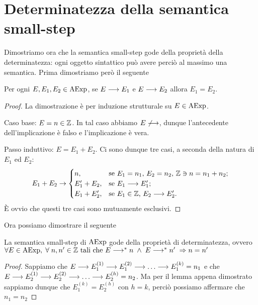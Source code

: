 \section{Determinatezza della semantica small-step}
Dimostriamo ora che la semantica small-step gode della proprietà della
determinatezza: ogni oggetto sintattico può avere perciò al massimo
una semantica. Prima dimostriamo però il seguente

\begin{teorema}
Per ogni $E, E_1, E_2 \in \mathrm{AExp}$, se $E \longrightarrow E_1$ e $E \longrightarrow E_2$
allora $E_1 = E_2$.
\end{teorema}

\begin{proof}
La dimostrazione è per induzione strutturale su $E \in \mathrm{AExp}$.

Caso base: $E = n \in \mathbb{Z}$.
In tal caso abbiamo $E \not \longrightarrow$, dunque l'antecedente dell'implicazione
è falso e l'implicazione è vera.

Passo induttivo: $E = E_1 + E_2$.
Ci sono dunque tre casi, a seconda della natura di $E_1$ ed $E_2$:
\[
  E_1 + E_2
    \rightarrow
      \begin{cases}
        n,          &\text{se $E_1 = n_1$, $E_2 = n_2$,
                           $\mathbb{Z} \ni n = n_1 + n_2$;} \\
        E_1' + E_2, &\text{se $E_1 \longrightarrow E_1'$;} \\
        E_1 + E_2', &\text{se $E_1 \in \mathbb{Z}$, $E_2 \longrightarrow E_2'$.}
      \end{cases}
\]
È ovvio che questi tre casi sono mutuamente esclusivi.
\end{proof}

Ora possiamo dimostrare il seguente

\begin{teorema}[Determinatezza]
La semantica small-step di $\mathrm{AExp}$ gode della proprietà di determinatezza, ovvero
$\forall E \in \mathrm{AExp}, \; \forall \; n, n' \in \mathbb{Z} \text{ tali che } E \longrightarrow ^* n \; \land \; E \longrightarrow ^* n' \; \Rightarrow n = n'$
\end{teorema}

\begin{proof}
Sappiamo che $E \ssarrow E_1^{(1)} \ssarrow E_1^{(2)} \ssarrow \dots \ssarrow E_1^{(k)} = n_1$ e che $E \ssarrow E_2^{(1)} \ssarrow E_2^{(2)} \ssarrow \dots \ssarrow E_2^{(h)} = n_2$.
Ma per il lemma appena dimostrato sappiamo dunque che $E_1^{(k)} = E_2^{(h)} \text{ con } h = k$, perciò possiamo affermare che $n_1 = n_2$
\end{proof}


